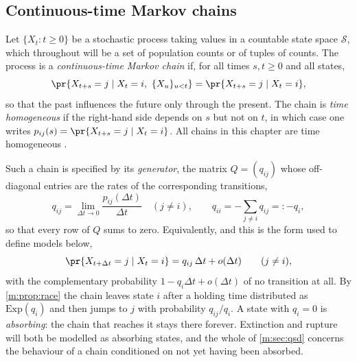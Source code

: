 \subsection{Continuous-time Markov chains}
\label{m:sec:ctmc}

Let $\{X_t : t\ge0\}$ be a stochastic process taking values in a countable state
space $\mathcal S$, which throughout will be a set of population counts or of
tuples of counts. The process is a \emph{continuous-time Markov chain} if, for all
times $s,t\ge0$ and all states,
\begin{equation}
\label{m:eq:markov}
\pr{X_{t+s} = j \mid X_t = i,\ \{X_u\}_{u<t}} = \pr{X_{t+s}=j\mid X_t = i},
\end{equation}
so that the past influences the future only through the present. The chain is
\emph{time homogeneous} if the right-hand side depends on $s$ but not on $t$, in
which case one writes $p_{ij}(s) = \pr{X_{t+s}=j\mid X_t=i}$. All chains in this
chapter are time homogeneous
.

Such a chain is specified by its \emph{generator}, the matrix $Q = (q_{ij})$ whose
off-diagonal entries are the rates of the corresponding transitions,
\begin{equation}
\label{m:eq:generator}
q_{ij} = \lim_{\Delta t\to0}\frac{p_{ij}(\Delta t)}{\Delta t}\quad(j\neq i),
\qquad
q_{ii} = -\sum_{j\neq i}q_{ij} =: -q_i ,
\end{equation}
so that every row of $Q$ sums to zero. Equivalently, and this is the form used to
define models below,
\begin{equation}
\label{m:eq:infinitesimal}
\pr{X_{t+\Delta t} = j \mid X_t = i} = q_{ij}\,\Delta t + o(\Delta t)
\qquad (j \neq i),
\end{equation}
with the complementary probability $1-q_i\Delta t + o(\Delta t)$ of no transition
at all. By \cref{m:prop:race} the chain leaves state $i$ after a holding time
distributed as $\mathrm{Exp}(q_i)$ and then jumps to $j$ with probability
$q_{ij}/q_i$. A state with $q_i=0$ is \emph{absorbing}: the chain that reaches it
stays there forever. Extinction and rupture will both be modelled as absorbing
states, and the whole of \cref{m:sec:qsd} concerns the behaviour of a chain
conditioned on not yet having been absorbed.

